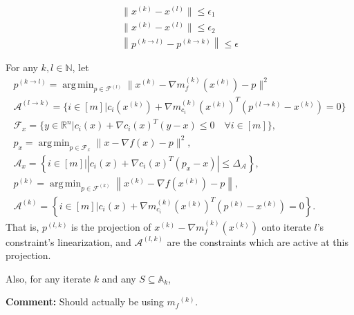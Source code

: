 \documentclass{article}
\newenvironment{comment}
  {\par\medskip
   \color{red}%
   \begin{framed}
   \textbf{Comment: }\ignorespaces}
 {\end{framed}
  \medskip}
\theoremstyle{case}
\numberwithin{theorem}{subsection}
\DeclareMathOperator*{\argmin}{arg\,min}
\newcommand{\activeconstraintsk}{{\mathbb A_{k}}}
\newcommand{\feasiblek}{{\mathcal F^{(k)}}}
\newcommand{\gk}{{\nabla m_f^{(k)}\left(\xk\right)}}
\newcommand{\gmcik}{{\nabla m_{c_i}^{(k)}\left(\xk\right)}}
\newcommand{\gradf}{\nabla f}
\newcommand{\mfk}{{{m}_f}^{(k)}}
\newcommand{\minactivegraddelta}{{\Delta_{\mathcal A}}}
\newcommand{\naturals}{\mathbb N}
\newcommand{\Rn}{\mathbb R^n}
\newcommand{\xk}{x^{(k)}}
\begin{document}
\begin{align*}
\|\xk - x^{(l)}\| \le \epsilon_1 \\
\|\xk - x^{(l)}\| \le \epsilon_2 \\
\left\|p^{(k\to l)} - p^{(k\to k)}\right\| \le \epsilon
\end{align*}


For any $k, l \in \naturals$, let 
\begin{align}
p^{(k \to l)} = \argmin_{p \in \mathcal F^{(l)}} \|\xk - \gk - p\|^2 \label{bp2_define_plk} \\
\mathcal A^{(l \to k)} = \{i \in [m] | c_i(\xk) + \gmcik^T(p^{(l\to k)} - \xk) = 0 \} \label{bp_define_activep_not_used} \\
\mathcal F_x = \{ y \in \Rn | c_i(x) + \nabla c_i(x)^T(y - x) \le 0 \quad \forall i \in [m]\}, \label{bp_define_true_linearization_not_used} \\
p_x = \argmin_{p \in \mathcal F_x} \|x - \gradf(x) - p\|^2, \label{bp_define_true_projection_not_used} \\
\mathcal A_x = \left\{i \in [m] | \left|c_i(x) + \nabla c_i(x)^T(p_x - x)\right| \le \minactivegraddelta \right\}, \label{define_projection_active_not_used} \\
p^{(k)} = \argmin_{p \in \feasiblek} \left\| \xk - \nabla f\left(\xk\right) - p \right\|, \label{bp_define_pl_not_used} \\
\mathcal A^{(k)} = \left\{i \in [m] | c_i(x) + \gmcik^T\left(p^{(k)} - \xk\right) = 0 \right\}. \label{bp_define_yet_another_thing_not_used}
\end{align}
That is, $p^{(l, k)}$ is the projection of $\xk - \gk$ onto iterate $l$'s constraint's linearization,
and $\mathcal A^{(l, k)}$ are the constraints which are active at this projection.

Also, for any iterate $k$ and any $S \subseteq \activeconstraintsk$,






\appendix


\begin{comment}
Should actually be using $\mfk$.
\end{comment}
\end{document}
